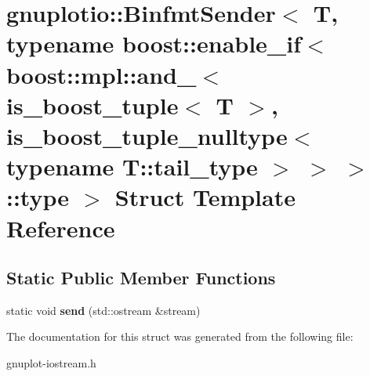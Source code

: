 \hypertarget{structgnuplotio_1_1BinfmtSender_3_01T_00_01typename_01boost_1_1enable__if_3_01boost_1_1mpl_1_1an36b5089f0cb57748545b30004479b7ea}{}\section{gnuplotio\+:\+:Binfmt\+Sender$<$ T, typename boost\+:\+:enable\+\_\+if$<$ boost\+:\+:mpl\+:\+:and\+\_\+$<$ is\+\_\+boost\+\_\+tuple$<$ T $>$, is\+\_\+boost\+\_\+tuple\+\_\+nulltype$<$ typename T\+:\+:tail\+\_\+type $>$ $>$ $>$\+:\+:type $>$ Struct Template Reference}
\label{structgnuplotio_1_1BinfmtSender_3_01T_00_01typename_01boost_1_1enable__if_3_01boost_1_1mpl_1_1an36b5089f0cb57748545b30004479b7ea}
\subsection*{Static Public Member Functions}
\begin{DoxyCompactItemize}
\item 
\mbox{\label{structgnuplotio_1_1BinfmtSender_3_01T_00_01typename_01boost_1_1enable__if_3_01boost_1_1mpl_1_1an36b5089f0cb57748545b30004479b7ea_aa1850ae529cdb36fedc67c5ebfa3f871}} 
static void {\bfseries send} (std\+::ostream \&stream)
\end{DoxyCompactItemize}


The documentation for this struct was generated from the following file\+:\begin{DoxyCompactItemize}
\item 
gnuplot-\/iostream.\+h\end{DoxyCompactItemize}
